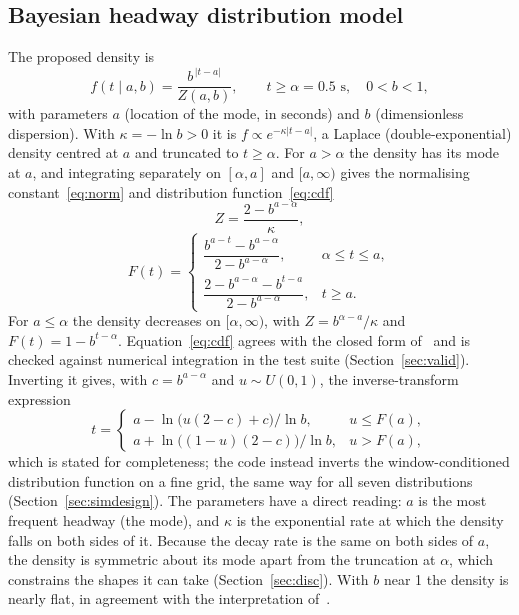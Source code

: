\documentclass[11pt,a4paper]{article}
\numberwithin{equation}{section}
\begin{document}
\subsection{Bayesian headway distribution model}\label{sec:proposed}
The proposed density is
\begin{equation}\label{eq:density}
f(t\mid a,b)=\frac{b^{\,|t-a|}}{Z(a,b)},\qquad t\ge\alpha=0.5\text{ s},\quad 0<b<1 ,
\end{equation}
with parameters $a$ (location of the mode, in seconds) and $b$ (dimensionless dispersion). With $\kappa=-\ln b>0$ it is $f\propto e^{-\kappa|t-a|}$, a Laplace (double-exponential) density centred at $a$ and truncated to
$t\ge\alpha$. For $a>\alpha$ the density has its mode at $a$, and integrating separately on $[\alpha,a]$ and $[a,\infty)$ gives the
normalising constant~\eqref{eq:norm} and distribution function~\eqref{eq:cdf}
\begin{equation}\label{eq:norm}
Z=\frac{2-b^{a-\alpha}}{\kappa},
\end{equation}
\begin{equation}\label{eq:cdf}
F(t)=\begin{cases}
\dfrac{b^{a-t}-b^{a-\alpha}}{2-b^{a-\alpha}}, & \alpha\le t\le a,\\[2ex]
\dfrac{2-b^{a-\alpha}-b^{t-a}}{2-b^{a-\alpha}}, & t\ge a .
\end{cases}
\end{equation}
For $a\le\alpha$ the density decreases on $[\alpha,\infty)$, with $Z=b^{\alpha-a}/\kappa$ and $F(t)=1-b^{t-\alpha}$. Equation~\eqref{eq:cdf} agrees with the
closed form of~\cite{leungbootnak} and is checked against numerical integration in the test suite (Section~\ref{sec:valid}). Inverting it gives, with $c=b^{a-\alpha}$ and $u\sim U(0,1)$, the inverse-transform expression
\begin{equation}\label{eq:sampler}
t=\begin{cases}
a-\ln\!\big(u(2-c)+c\big)/\ln b, & u\le F(a),\\[0.5ex]
a+\ln\!\big((1-u)(2-c)\big)/\ln b, & u>F(a),
\end{cases}
\end{equation}
which is stated for completeness; the code instead inverts the window-conditioned distribution function on a fine grid, the same way for all seven distributions (Section~\ref{sec:simdesign}).
The parameters have a direct reading: $a$ is the most frequent headway (the mode), and $\kappa$ is the exponential rate at which the density
falls on both sides of it. Because the decay rate is the same on both sides of $a$, the density is symmetric about its mode apart from the truncation at $\alpha$,
which constrains the shapes it can take (Section~\ref{sec:disc}). With $b$ near 1 the density is nearly flat, in agreement with the interpretation of~\cite{leungbootnak}.
\end{document}
